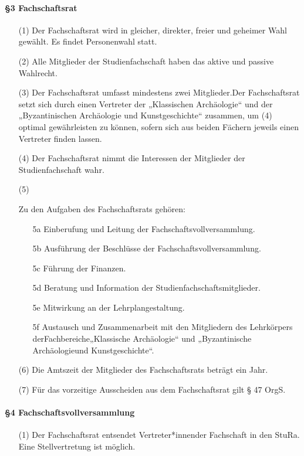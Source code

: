 {    \paragraph{§3 Fachschaftsrat}
    \begin{enumerate}
        \item[(1)] Der  Fachschaftsrat  wird  in  gleicher,  direkter,  freier  und  geheimer  Wahl  gewählt.  Es  findet Personenwahl statt.
        \item[(2)] Alle Mitglieder der Studienfachschaft haben das aktive und passive Wahlrecht.
        \item[(3)] Der Fachschaftsrat umfasst mindestens zwei Mitglieder.Der Fachschaftsrat setzt sich durch einen  Vertreter  der  „Klassischen  Archäologie“  und  der  „Byzantinischen  Archäologie  und Kunstgeschichte“  zusammen,  um  (4)  optimal  gewährleisten  zu  können,  sofern  sich  aus beiden Fächern jeweils einen Vertreter finden lassen.
        \item[(4)] Der Fachschaftsrat nimmt die Interessen der Mitglieder der Studienfachschaft wahr.
        \item[(5)] {Zu den Aufgaben des Fachschaftsrats gehören:
            \begin{enumerate}
                \item[5a] Einberufung und Leitung der Fachschaftsvollversammlung.
                \item[5b] Ausführung der Beschlüsse der Fachschaftsvollversammlung.
                \item[5c] Führung der Finanzen.
                \item[5d] Beratung und Information der Studienfachschaftsmitglieder.
                \item[5e] Mitwirkung an der Lehrplangestaltung.
                \item[5f] Austausch und Zusammenarbeit mit den Mitgliedern des Lehrkörpers derFachbereiche„Klassische Archäologie“ und „Byzantinische Archäologieund Kunstgeschichte“.
            \end{enumerate}}
        \item[(6)] Die Amtszeit der Mitglieder des Fachschaftsrats beträgt ein Jahr.
        \item[(7)] Für das vorzeitige Ausscheiden aus dem Fachschaftsrat gilt § 47 OrgS. 
    \end{enumerate}
    \paragraph{§4 Fachschaftsvollversammlung}
    \begin{enumerate}
        \item[(1)] Der Fachschaftsrat   entsendet   Vertreter*innender   Fachschaft   in   den   StuRa.   Eine Stellvertretung ist möglich. 
    \end{enumerate}
}
